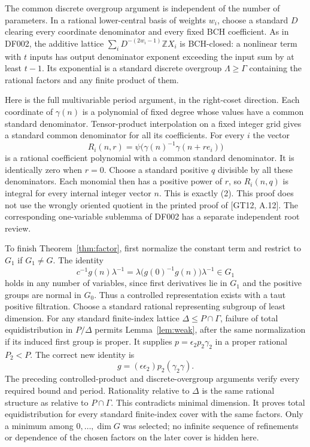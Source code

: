 \documentclass[11pt]{article}
\newcommand{\Z}{\mathbb Z}\newcommand{\R}{\mathbb R}
\begin{document}
The common discrete overgroup argument is independent of the number of
parameters. In a rational lower-central basis of weights $w_i$, choose a
standard $D$ clearing every coordinate denominator and every fixed BCH
coefficient. As in DF002, the additive lattice
$\sum_iD^{-(2w_i-1)}\Z X_i$ is BCH-closed: a nonlinear term with $t$
inputs has output denominator exponent exceeding the input sum by at least
$t-1$. Its exponential is a standard discrete overgroup $\Lambda\geq\Gamma$
containing the rational factors and any finite product of them.

Here is the full multivariable period argument, in the right-coset direction.
Each coordinate of $\gamma(n)$ is a polynomial of fixed degree whose values
have a common standard denominator. Tensor-product interpolation on a fixed
integer grid gives a standard common denominator for all its coefficients.
For every $i$ the vector
\[
 R_i(n,r)=\psi\bigl(\gamma(n)^{-1}\gamma(n+re_i)\bigr)
\]
is a rational coefficient polynomial with a common standard denominator.
It is identically zero when $r=0$. Choose a standard positive $q$ divisible
by all these denominators. Each monomial then has a positive power of $r$,
so $R_i(n,q)$ is integral for every internal integer vector $n$.
This is exactly (2). This proof does not use the wrongly oriented quotient
in the printed proof of [GT12, A.12]. The corresponding one-variable
sublemma of DF002 has a separate independent root review.

To finish Theorem~\ref{thm:factor}, first normalize the constant term and
restrict to $G_1$ if $G_1\ne G$. The identity
\[
 c^{-1}g(n)\lambda^{-1}
          =\lambda\bigl(g(0)^{-1}g(n)\bigr)\lambda^{-1}\in G_1
\]
holds in any number of variables, since first derivatives lie in $G_1$ and
the positive groups are normal in $G_0$. Thus a controlled representation
exists with a taut positive filtration.
Choose a standard rational representing subgroup of least dimension.
For any standard finite-index lattice $\Delta\leq P\cap\Gamma$, failure
of total equidistribution in $P/\Delta$ permits Lemma~\ref{lem:weak}, after
the same normalization if its induced first group is proper.
It supplies $p=\epsilon_2p_2\gamma_2$ in a proper rational $P_2<P$.
The correct new identity is
\[
                 g=(\epsilon\epsilon_2)p_2(\gamma_2\gamma).
\]
The preceding controlled-product and discrete-overgroup arguments verify
every required bound and period. Rationality relative to $\Delta$ is the
same rational structure as relative to $P\cap\Gamma$.
This contradicts minimal dimension. It proves total equidistribution for
every standard finite-index cover with the same factors. Only a minimum
among $0,\ldots,\dim G$ was selected; no infinite sequence of refinements
or dependence of the chosen factors on the later cover is hidden here.
\end{document}
